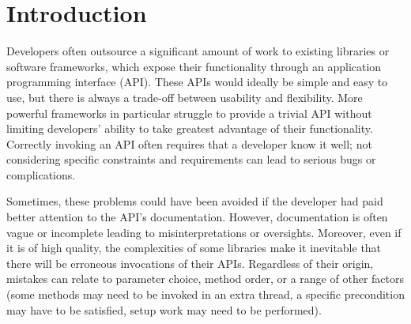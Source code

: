 \chapter{Introduction}\label{ch:intro}

Developers often outsource a significant amount of work to existing libraries or software frameworks, which expose their functionality through an application programming interface (API).
These APIs would ideally be simple and easy to use, but there is always a trade-off between usability and flexibility.
More powerful frameworks in particular struggle to provide a trivial API without limiting developers' ability to take greatest advantage of their functionality.
Correctly invoking an API often requires that a developer know it well;
not considering specific constraints and requirements can lead to serious bugs or complications.

Sometimes, these problems could have been avoided if the developer had paid better attention to the API's documentation.
However, documentation is often vague or incomplete leading to misinterpretations or oversights.
Moreover, even if it is of high quality, the complexities of some libraries make it inevitable that there will be erroneous invocations of their APIs.
Regardless of their origin, mistakes can relate to parameter choice, method order, or a range of other factors (some methods may need to be invoked in an extra thread, a specific precondition may have to be satisfied, setup work may need to be performed).

